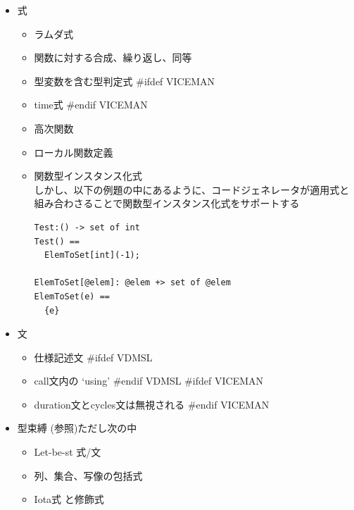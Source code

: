 \documentclass[\pformat,11pt]{jarticle}
\newcommand{\langmancite}{\cite{LangManPP-SCSK}}
\newcommand{\VDM}{VDM++}
\begin{document}
\begin{itemize}

\item 式

  \begin{itemize}
  \item ラムダ式
  \item 関数に対する合成、繰り返し、同等
  \item 型変数を含む型判定式
#ifdef VICEMAN
  \item time式
#endif VICEMAN
  \item 高次関数
  \item ローカル関数定義
  \item 関数型インスタンス化式 \\ しかし、以下の例題の中にあるように、コードジェネレータが適用式と組み合わさることで関数型インスタンス化式をサポートする

\begin{screen}
\begin{verbatim}
Test:() -> set of int
Test() ==
  ElemToSet[int](-1);

ElemToSet[@elem]: @elem +> set of @elem
ElemToSet(e) ==
  {e}
\end{verbatim}
\end{screen}

  \end{itemize}

\item 文
  \begin{itemize}
  \item 仕様記述文
#ifdef VDMSL
  \item call文内の `{\sf using}'
#endif VDMSL
#ifdef VICEMAN
  \item duration文とcycles文は無視される
#endif VICEMAN
  \end{itemize}

\item 型束縛 (\langmancite 参照)ただし次の中

  \begin{itemize}
  \item Let-be-st 式/文
  \item 列、集合、写像の包括式
  \item Iota式 と修飾式
  \end{itemize}


\end{itemize}
\end{document}
